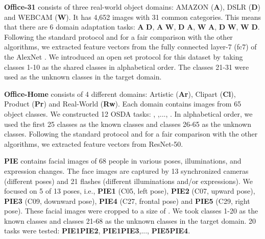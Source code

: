 \documentclass[journal]{IEEEtran}
\begin{document}
\textbf{Office-31} \cite{DBLP:conf/eccv/SaenkoKFD10} consists of three real-world object domains: AMAZON (\textbf{A}), DSLR (\textbf{D}) and WEBCAM (\textbf{W}). It has 4,652 images with 31 common categories. This means that there are 6 domain adaptation tasks: \textbf{A}  \textbf{D}, \textbf{A}  \textbf{W}, \textbf{D}  \textbf{A}, \textbf{W}  \textbf{A}, \textbf{D}  \textbf{W}, \textbf{W}  \textbf{D}. Following the standard protocol and for a fair comparison with the other algorithms, we extracted feature vectors from the fully connected layer-7 (fc7) of the AlexNet \cite{DBLP:conf/nips/KrizhevskySH12}.
We introduced an open set protocol for this dataset by taking classes 1-10 as the shared classes in alphabetical order. The classes 21-31 were used as the unknown classes in the target domain. 

\textbf{Office-Home} \cite{DBLP:conf/cvpr/VenkateswaraECP17} consists of 4 different domains: Artistic (\textbf{Ar}), Clipart (\textbf{Cl}), Product (\textbf{Pr}) and Real-World (\textbf{Rw}).  Each domain contains images from 65 object classes. We constructed 12 OSDA tasks: , ,..., . In alphabetical order, we used the first 25 classes as the known classes and classes 26-65 as the unknown classes. Following the standard protocol and for a fair comparison with  the other  algorithms, we extracted feature vectors from ResNet-50. 

\textbf{PIE}\cite{DBLP:journals/pami/SimBB03} contains  facial images of 68 people in various poses, illuminations, and expression changes.  The face images are captured by 13 synchronized cameras (different poses) and 21 flashes (different illuminations and/or expressions). We focused on 5 of 13 poses, i.e., \textbf{PIE1} (C05, left pose), \textbf{PIE2} (C07, upward pose), \textbf{PIE3} (C09, downward pose), \textbf{PIE4} (C27, frontal pose) and \textbf{PIE5} (C29, right pose).
These facial images were cropped to a size of . We took classes 1-20 as the known classes and classes 21-68 as the unknown classes in the target domain. 20 tasks were tested: \textbf{PIE1}\textbf{PIE2}, \textbf{PIE1}\textbf{PIE3},..., \textbf{PIE5}\textbf{PIE4}.
\end{document}
